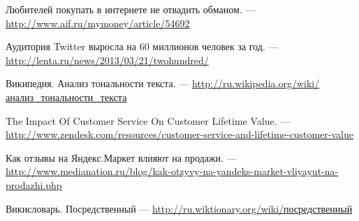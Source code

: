 Любителей покупать в интернете не отвадить обманом. --- \url{http://www.aif.ru/mymoney/article/54692}

Аудитория Twitter выросла на 60 миллионов человек за год. --- \url{http://lenta.ru/news/2013/03/21/twohundred/}

Википедия. Анализ тональности текста. --- \href{http://ru.wikipedia.org/wiki/%D0%90%D0%BD%D0%B0%D0%BB%D0%B8%D0%B7_%D1%82%D0%BE%D0%BD%D0%B0%D0%BB%D1%8C%D0%BD%D0%BE%D1%81%D1%82%D0%B8_%D1%82%D0%B5%D0%BA%D1%81%D1%82%D0%B0}{http://ru.wikipedia.org/wiki/анализ\_тональности\_текста}

The Impact Of Customer Service On Customer Lifetime Value. --- \url{http://www.zendesk.com/resources/customer-service-and-lifetime-customer-value}

Как отзывы на Яндекс.Маркет влияют на продажи. --- \url{http://www.medianation.ru/blog/kak-otzyvy-na-yandeks-market-vliyayut-na-prodazhi.php}

Викисловарь. Посредственный --- \href{http://ru.wiktionary.org/wiki/%D0%BF%D0%BE%D1%81%D1%80%D0%B5%D0%B4%D1%81%D1%82%D0%B2%D0%B5%D0%BD%D0%BD%D1%8B%D0%B9}{http://ru.wiktionary.org/wiki/посредственный}